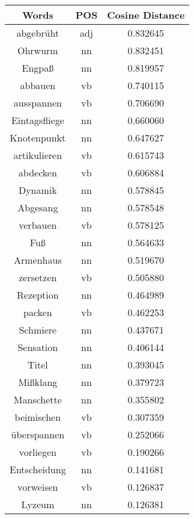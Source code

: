 \begin{table}[h]
\centering
\begin{tabular}{ccc} 
\toprule
Words              & POS & Cosine Distance  \\ 
\midrule
abgebrüht          & adj & 0.832645         \\
Ohrwurm            & nn  & 0.832451         \\
Engpaß             & nn  & 0.819957         \\
abbauen            & vb  & 0.740115         \\
ausspannen         & vb  & 0.706690         \\
Eintagsfliege      & nn  & 0.660060         \\
Knotenpunkt        & nn  & 0.647627         \\
artikulieren       & vb  & 0.615743         \\
abdecken           & vb  & 0.606884         \\
Dynamik            & nn  & 0.578845         \\
Abgesang           & nn  & 0.578548         \\
verbauen           & vb  & 0.578125         \\
Fuß                & nn  & 0.564633         \\
Armenhaus          & nn  & 0.519670         \\
zersetzen          & vb  & 0.505880         \\
Rezeption          & nn  & 0.464989         \\
packen             & vb  & 0.462253         \\
Schmiere           & nn  & 0.437671         \\
Sensation          & nn  & 0.406144         \\
Titel              & nn  & 0.393045         \\
Mißklang           & nn  & 0.379723         \\
Manschette         & nn  & 0.355802         \\
beimischen         & vb  & 0.307359         \\
überspannen        & vb  & 0.252066         \\
vorliegen          & vb  & 0.190266         \\
Entscheidung       & nn  & 0.141681         \\
vorweisen          & vb  & 0.126837         \\
Lyzeum             & nn  & 0.126381         \\

\end{tabular}
\end{table}
